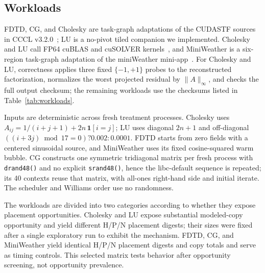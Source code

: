 \documentclass[sigconf]{acmart}
\begin{document}
\subsection{Workloads}\label{sec:workloads}

FDTD, CG, and Cholesky are task-graph adaptations of the CUDASTF sources in CCCL v3.2.0~\citep{nvidia2026cccl320}; LU is a no-pivot tiled companion we implemented. Cholesky and LU call FP64 cuBLAS and cuSOLVER kernels~\citep{nvidia2024cublas,nvidia2024cusolver}, and MiniWeather is a six-region task-graph adaptation of the miniWeather mini-app~\citep{norman2018miniweather}. For Cholesky and LU, correctness applies three fixed \(\{-1,+1\}\) probes to the reconstructed factorization, normalizes the worst projected residual by \(\lVert A\rVert_\infty\), and checks the full output checksum; the remaining workloads use the checksums listed in Table~\ref{tab:workloads}.

Inputs are deterministic across fresh treatment processes. Cholesky uses \(A_{ij}=1/(i+j+1)+2n\,\mathbf{1}[i=j]\); LU uses diagonal \(2n+1\) and off-diagonal \(((i+3j)\bmod17=0)?0.002:0.0001\). FDTD starts from zero fields with a centered sinusoidal source, and MiniWeather uses its fixed cosine-squared warm bubble. CG constructs one symmetric tridiagonal matrix per fresh process with \texttt{drand48()} and no explicit \texttt{srand48()}, hence the libc-default sequence is repeated; its 40 contexts reuse that matrix, with all-ones right-hand side and initial iterate. The scheduler and Williams order use no randomness.

The workloads are divided into two categories according to whether they expose placement opportunities. Cholesky and LU expose substantial modeled-copy opportunity and yield different H/P/N placement digests; their sizes were fixed after a single exploratory run to exhibit the mechanism. FDTD, CG, and MiniWeather yield identical H/P/N placement digests and copy totals and serve as timing controls. This selected matrix tests behavior after opportunity screening, not opportunity prevalence.
\end{document}
